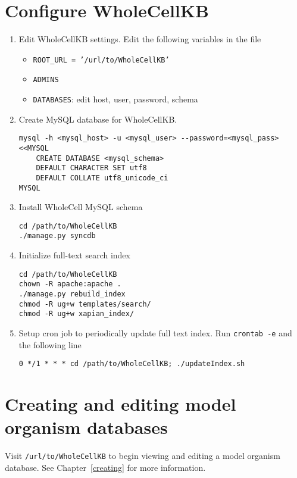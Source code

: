\documentclass[twoside]{book}
\begin{document}
\section{Configure WholeCellKB}
\begin{enumerate}
\item Edit WholeCellKB settings. Edit the following variables in the file 
\begin{itemize}
\item \texttt{ROOT\_URL = '/url/to/WholeCellKB'}
\item \texttt{ADMINS}
\item \texttt{DATABASES}: edit host, user, password, schema
\end{itemize}
		
\item Create MySQL database for WholeCellKB.
\begin{verbatim}
mysql -h <mysql_host> -u <mysql_user> --password=<mysql_pass> <<MYSQL
    CREATE DATABASE <mysql_schema>
    DEFAULT CHARACTER SET utf8
    DEFAULT COLLATE utf8_unicode_ci
MYSQL
\end{verbatim}
		
\item Install WholeCell MySQL schema
\begin{verbatim}
cd /path/to/WholeCellKB
./manage.py syncdb
\end{verbatim}
	
\item Initialize full-text search index
\begin{verbatim}
cd /path/to/WholeCellKB
chown -R apache:apache .
./manage.py rebuild_index
chmod -R ug+w templates/search/
chmod -R ug+w xapian_index/
\end{verbatim}
		
\item Setup cron job to periodically update full text index. Run \texttt{crontab -e} and the following line
\begin{verbatim}
0 */1 * * * cd /path/to/WholeCellKB; ./updateIndex.sh
\end{verbatim}
\end{enumerate}
	
\section{Creating and editing model organism databases}
Visit \texttt{/url/to/WholeCellKB} to begin viewing and editing a model organism database. See Chapter~\ref{creating} for more information.
\end{document}

